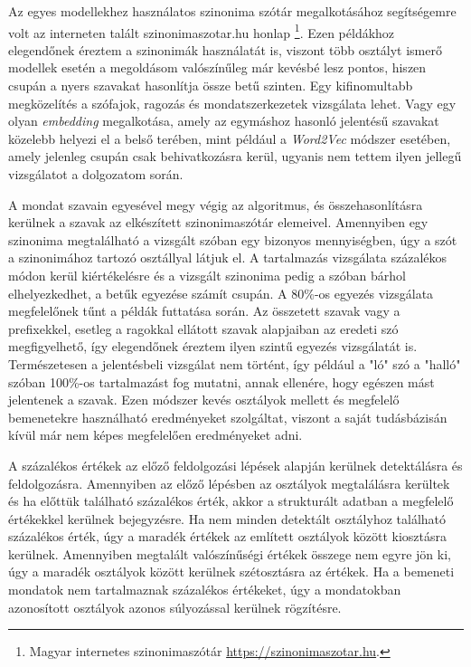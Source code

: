 Az egyes modellekhez használatos szinonima szótár megalkotásához segítségemre volt az interneten talált szinonimaszotar.hu honlap \footnote{Magyar internetes szinonimaszótár \url{https://szinonimaszotar.hu}.}. Ezen példákhoz elegendőnek éreztem a szinonimák használatát is, viszont több osztályt ismerő modellek esetén a megoldásom valószínűleg már kevésbé lesz pontos, hiszen csupán a nyers szavakat hasonlítja össze betű szinten. Egy kifinomultabb megközelítés a szófajok, ragozás és mondatszerkezetek vizsgálata lehet. Vagy egy olyan \textit{embedding} megalkotása, amely az egymáshoz hasonló jelentésű szavakat közelebb helyezi el a belső terében, mint például a \textit{Word2Vec} \cite{mikolov2013efficient} módszer esetében, amely jelenleg csupán csak behivatkozásra kerül, ugyanis nem tettem ilyen jellegű vizsgálatot a dolgozatom során.

A mondat szavain egyesével megy végig az algoritmus, és összehasonlításra kerülnek a szavak az elkészített szinonimaszótár elemeivel. Amennyiben egy szinonima megtalálható a vizsgált szóban egy bizonyos mennyiségben, úgy a szót a szinonimához tartozó osztállyal látjuk el. A tartalmazás vizsgálata százalékos módon kerül kiértékelésre és a vizsgált szinonima pedig a szóban bárhol elhelyezkedhet, a betűk egyezése számít csupán. A 80\%-os egyezés vizsgálata megfelelőnek tűnt a példák futtatása során. Az összetett szavak vagy a prefixekkel, esetleg a ragokkal ellátott szavak alapjaiban az eredeti szó megfigyelhető, így elegendőnek éreztem ilyen szintű egyezés vizsgálatát is. Természetesen a jelentésbeli vizsgálat nem történt, így például a "ló" szó a "halló" szóban 100\%-os tartalmazást fog mutatni, annak ellenére, hogy egészen mást jelentenek a szavak.
Ezen módszer kevés osztályok mellett és megfelelő bemenetekre használható eredményeket szolgáltat, viszont a saját tudásbázisán kívül már nem képes megfelelően eredményeket adni.

A százalékos értékek az előző feldolgozási lépések alapján kerülnek detektálásra és feldolgozásra. Amennyiben az előző lépésben az osztályok megtalálásra kerültek és ha előttük található százalékos érték, akkor a strukturált adatban a megfelelő értékekkel kerülnek bejegyzésre. Ha nem minden detektált osztályhoz található százalékos érték, úgy a maradék értékek az említett osztályok között kiosztásra kerülnek.
Amennyiben megtalált valószínűségi értékek összege nem egyre jön ki, úgy a maradék osztályok között kerülnek szétosztásra az értékek. Ha a bemeneti mondatok nem tartalmaznak százalékos értékeket, úgy a mondatokban azonosított osztályok azonos súlyozással kerülnek rögzítésre.

